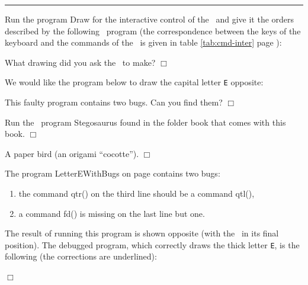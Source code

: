 \noindent \rule{137mm}{0.1mm}\par\nopagebreak %
\begin{exercice}{
Run the program {\idt Draw} for the interactive control
of the \robot\ and give it the orders described by
the following \python\ program (the correspondence between the keys of the
keyboard and the commands of the \robot\ is given in table
\ref{tab:cmd-inter} page \pageref{tab:cmd-inter}):

\noindent What drawing did you ask the \robot\ to make?
\noindent $\Box$}\end{exercice}
\begin{exercice}{
We would like the program below to draw the capital letter {\tt E}
\hbox{opposite:}

{\raggedright
\vspace{\baselineskip}
\vspace*{3cm}%
\vspace*{-3cm}%
 \label{prog:LettreEavecBogues}
 
 }
\noindent This faulty program contains two bugs. Can you find them?
\noindent $\Box$}\end{exercice}
\begin{exercice}{
Run the \python\ program {\idt Stegosaurus} found in the folder
{\idt book} that comes with this book.
\noindent $\Box$}\end{exercice}
\begin{corrige}{
A paper bird (an origami ``cocotte'').
\noindent $\Box$}\end{corrige}
\begin{corrige}{
The program {\idt LetterEWithBugs} on page \pageref{prog:LettreEavecBogues}
contains two bugs:\\
\begin{minipage}[t]{115mm}
\begin{enumerate}
\item the command {\idt qtr()} on the third line
should be a command {\idt qtl()},
\item a command {\idt fd()} is missing on the last line but one.
\end{enumerate}
The result of running this program is shown opposite
(with the \robot\ in its final position).
The debugged program, which correctly draws the thick letter {\tt E}, is the following (the corrections are
un\-der\-lined):
\end{minipage}
\hfill
\begin{minipage}[t]{17mm}
\vspace{3.2cm}%
\hspace{-1.7cm}  %
\end{minipage}

\noindent $\Box$}\end{corrige}
